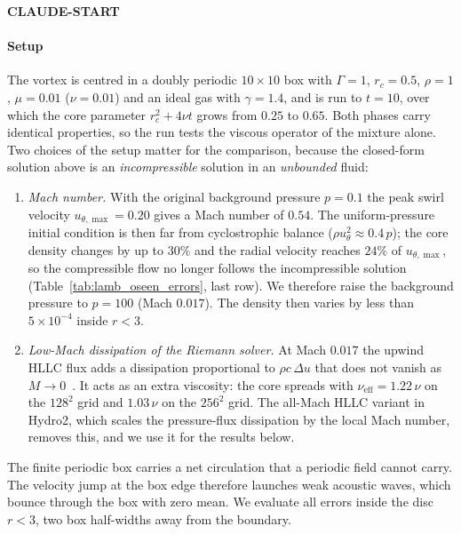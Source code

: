 \textbf{CLAUDE-START}

\paragraph{Setup}
The vortex is centred in a doubly periodic $10\times10$ box with $\Gamma = 1$, $r_c = 0.5$, $\rho = 1$, $\mu = 0.01$ ($\nu = 0.01$) and an ideal gas with $\gamma = 1.4$, and is run to $t = 10$, over which the core parameter $r_c^2 + 4\nu t$ grows from $0.25$ to $0.65$. Both phases carry identical properties, so the run tests the viscous operator of the mixture alone. Two choices of the setup matter for the comparison, because the closed-form solution above is an \emph{incompressible} solution in an \emph{unbounded} fluid:
\begin{enumerate}
    \item \emph{Mach number.} With the original background pressure $p = 0.1$ the peak swirl velocity $u_{\theta,\max} = 0.20$ gives a Mach number of $0.54$. The uniform-pressure initial condition is then far from cyclostrophic balance ($\rho u_\theta^2 \approx 0.4\,p$); the core density changes by up to $30\%$ and the radial velocity reaches $24\%$ of $u_{\theta,\max}$, so the compressible flow no longer follows the incompressible solution (Table~\ref{tab:lamb_oseen_errors}, last row). We therefore raise the background pressure to $p = 100$ (Mach $0.017$). The density then varies by less than $5\times10^{-4}$ inside $r < 3$.
    \item \emph{Low-Mach dissipation of the Riemann solver.} At Mach $0.017$ the upwind HLLC flux adds a dissipation proportional to $\rho c\,\Delta u$ that does not vanish as $M\to0$~\cite{guillard1999behaviour}. It acts as an extra viscosity: the core spreads with $\nu_{\mathrm{eff}} = 1.22\,\nu$ on the $128^2$ grid and $1.03\,\nu$ on the $256^2$ grid. The all-Mach HLLC variant in Hydro2, which scales the pressure-flux dissipation by the local Mach number, removes this, and we use it for the results below.
\end{enumerate}
The finite periodic box carries a net circulation that a periodic field cannot carry. The velocity jump at the box edge therefore launches weak acoustic waves, which bounce through the box with zero mean. We evaluate all errors inside the disc $r < 3$, two box half-widths away from the boundary.

